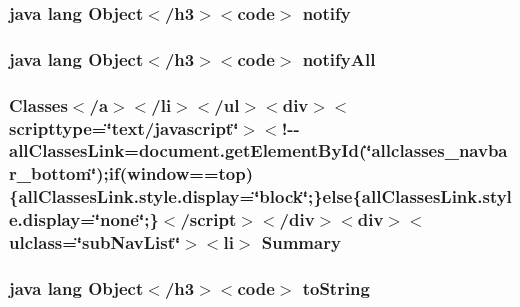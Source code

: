 \hypertarget{cloudia__android_2_fetch_sensor_alerts_8html_ae99ae10b5010594dbda4794e02db271b}{
\subsubsection[{notify}]{\setlength{\rightskip}{0pt plus 5cm}java lang Object$<$/h3$>$$<$code$>$ notify}}\label{cloudia__android_2_fetch_sensor_alerts_8html_ae99ae10b5010594dbda4794e02db271b}
\hypertarget{cloudia__android_2_fetch_sensor_alerts_8html_a1279357e6e09e33e75b55eb05fdb6436}{
\subsubsection[{notify\-All}]{\setlength{\rightskip}{0pt plus 5cm}java lang Object$<$/h3$>$$<$code$>$ notify\-All}}\label{cloudia__android_2_fetch_sensor_alerts_8html_a1279357e6e09e33e75b55eb05fdb6436}
\hypertarget{cloudia__android_2_fetch_sensor_alerts_8html_a6f9ab45abc9b0679dc1b132fbacfc681}{
\subsubsection[{Summary}]{\setlength{\rightskip}{0pt plus 5cm}Classes$<$/{\bf a}$>$$<$/li$>$$<$/ul$>$$<$div$>$$<$scripttype=\char`\"{}text/javascript\char`\"{}$>$$<$!-\/-\/all\-Classes\-Link=document.\-get\-Element\-By\-Id(\char`\"{}allclasses\-\_\-navbar\-\_\-bottom\char`\"{});if(window==top)\{all\-Classes\-Link.\-style.\-display=\char`\"{}block\char`\"{};\}else\{all\-Classes\-Link.\-style.\-display=\char`\"{}none\char`\"{};\}$<$/script$>$$<$/div$>$$<$div$>$$<$ulclass=\char`\"{}sub\-Nav\-List\char`\"{}$>$$<$li$>$ Summary}}\label{cloudia__android_2_fetch_sensor_alerts_8html_a6f9ab45abc9b0679dc1b132fbacfc681}
\hypertarget{cloudia__android_2_fetch_sensor_alerts_8html_a36e8a76a4132c9a7081416f27d087615}{
\subsubsection[{to\-String}]{\setlength{\rightskip}{0pt plus 5cm}java lang Object$<$/h3$>$$<$code$>$ to\-String}}\label{cloudia__android_2_fetch_sensor_alerts_8html_a36e8a76a4132c9a7081416f27d087615}
